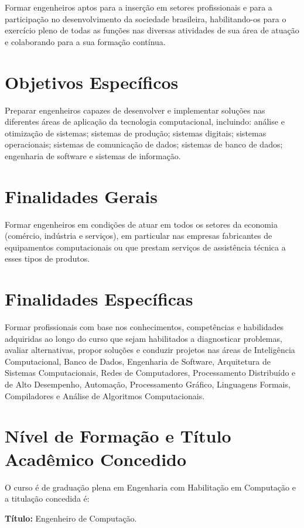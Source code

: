 Formar engenheiros aptos para a inserção em setores profissionais e para a participação no desenvolvimento da sociedade brasileira, habilitando-os para o exercício pleno de todas as funções nas diversas atividades de sua área de atuação e colaborando para a sua formação contínua.

\section{Objetivos Específicos}
Preparar engenheiros capazes de desenvolver e implementar soluções nas diferentes áreas de aplicação da tecnologia computacional, incluindo: análise e otimização de sistemas; sistemas de produção; sistemas digitais; sistemas operacionais; sistemas de comunicação de dados; sistemas de banco de dados; engenharia de software e sistemas de informação.

\section{Finalidades Gerais}
Formar engenheiros em condições de atuar em todos os setores da economia (comércio, indústria e serviços), em particular nas empresas fabricantes de equipamentos computacionais ou que prestam serviços de assistência técnica a esses tipos de produtos.

\section{Finalidades Específicas}
Formar profissionais com base nos conhecimentos, competências e habilidades adquiridas ao longo do curso que sejam habilitados a diagnosticar problemas, avaliar alternativas, propor soluções e conduzir projetos nas áreas de Inteligência Computacional, Banco de Dados, Engenharia de Software, Arquitetura de Sistemas Computacionais, Redes de Computadores, Processamento Distribuído e de Alto Desempenho, Automação, Processamento Gráfico, Linguagens Formais, Compiladores e Análise de Algoritmos Computacionais.

\section{Nível de Formação e Título Acadêmico Concedido}
O curso é de graduação plena em Engenharia com Habilitação em Computação e a titulação concedida é:

\textbf{Título:} Engenheiro de Computação.

